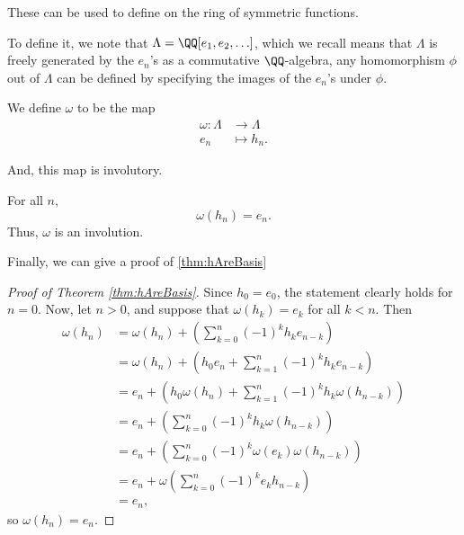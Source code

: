 \documentclass{article}
\newcommand{\pring}[2]{#1 [ {#2} ]}
\begin{document}
These can be used to define  on the ring of symmetric functions.

To define it, we note that $\Lambda = \pring{\QQ}{e_1,e_2,\ldots}$, which we recall means that $\Lambda$ is freely generated by the $e_n$'s as a commutative $\QQ$-algebra, any homomorphism $\phi$ out of $\Lambda$ can be defined by specifying the images of the $e_n$'s under $\phi$.

\begin{definition}
    We define $\omega$ to be the map 
    \begin{align*}
        \omega: \Lambda &\to \Lambda \\
        e_n &\mapsto h_n.
    \end{align*}
\end{definition}

And, this map is involutory.

\begin{theorem}
    \label{thm:OmegaIsInvolution}
    For all $n$,
    \[
        \omega(h_n) = e_n.
    \]
    Thus, $\omega$ is an involution.
\end{theorem}

Finally, we can give a proof of \ref{thm:hAreBasis}

\begin{proof}
    [Proof of Theorem \ref{thm:hAreBasis}]
    Since $h_0 = e_0$, the statement clearly holds for $n=0$.
    Now, let $n > 0$, and suppose that $\omega(h_k) = e_k$ for all $k < n$.
    Then
    \begin{align*}
        \omega(h_n)
        &=
        \omega(h_n)
        + \left(
            \sum_{k=0}^n 
            (-1)^k h_ke_{n-k}
        \right)
        \\
        &=
        \omega(h_n)
        + \left(
            h_0 e_n
            + \sum_{k=1}^n 
            (-1)^k h_ke_{n-k}
        \right)
        \\
        &=
        e_n
        + \left(
            h_0 \omega(h_n)
            + \sum_{k=1}^n 
            (-1)^k h_k\omega(h_{n-k})
        \right)
        \\
        &=
        e_n
        + \left(
            \sum_{k=0}^n 
            (-1)^k h_k\omega(h_{n-k})
        \right)
        \\
        &=
        e_n
        + \left(
            \sum_{k=0}^n 
            (-1)^k \omega(e_k)\omega(h_{n-k})
        \right)
        \\
        &=
        e_n
        + \omega \left(
            \sum_{k=0}^n 
            (-1)^k e_k h_{n-k}
        \right)
        \\
        &=
        e_n,
    \end{align*}
    so $\omega(h_n) = e_n$.
\end{proof}
\end{document}
